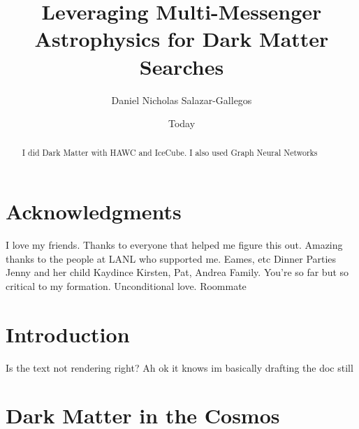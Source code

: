 \documentclass[PhD]{msu-thesis}
\title{Leveraging Multi-Messenger Astrophysics for Dark Matter Searches}
\author{Daniel Nicholas Salazar-Gallegos}
\date{Today}
\begin{document}
\frontmatter
\maketitlepage

\begin{abstract}
    I did Dark Matter with HAWC and IceCube. I also used Graph Neural Networks
\end{abstract}

\clearpage
\makecopyrightpage
\clearpage

\chapter*{Acknowledgments}
\DoubleSpacing
I love my friends.
Thanks to everyone that helped me figure this out.
Amazing thanks to the people at LANL who supported me.
Eames, etc
Dinner Parties
Jenny and her child Kaydince
Kirsten, Pat, Andrea
Family. You're so far but so critical to my formation. Unconditional love.
Roommate

\clearpage
\SingleSpacing
\tableofcontents*
\clearpage

\listoftables

\clearpage
\listoffigures

\begin{abbreviations}
\end{abbreviations}
\mainmatter

\chapter{Introduction\label{sec:intro}}
Is the text not rendering right? Ah ok it knows im basically drafting the doc still

\chapter{Dark Matter in the Cosmos\label{sec:dm_cosmos}}

\end{document}
